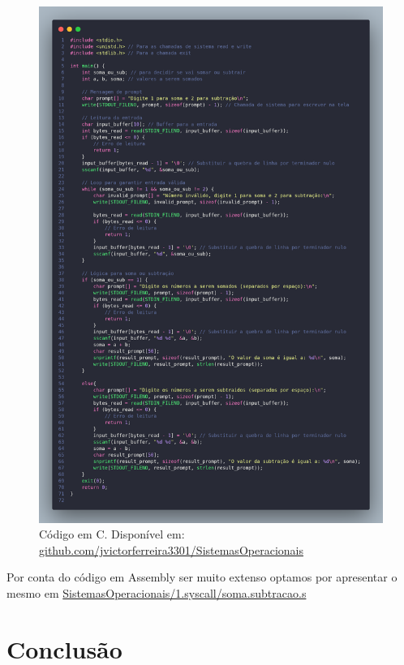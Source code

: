 \documentclass[
	12pt,				%
	openright,			%
	oneside,			%
	a4paper,			%
	chapter=TITLE,		%
	english,			%
	french,				%
	spanish,			%
	brazil				%
	]{abntex2}
\theoremstyle{definition}
\begin{document}
\begin{figure}
	\centering
	\begin{minipage}{1.0\textwidth}
	  \includegraphics[width=1.0\linewidth]{imagens/code_c.png}
	  \caption{Código em C. Disponível em: \href{https://github.com/jvictorferreira3301/Sistemas_Operacionais}{github.com/jvictorferreira3301/SistemasOperacionais}}
	\end{minipage}
\end{figure}

Por conta do código em Assembly ser muito extenso optamos por apresentar o mesmo em \href{https://github.com/jvictorferreira3301/Sistemas_Operacionais}
{SistemasOperacionais/1.syscall/soma.subtracao.s}

\chapter{Conclusão}
\label{conclusao}
\end{document}
